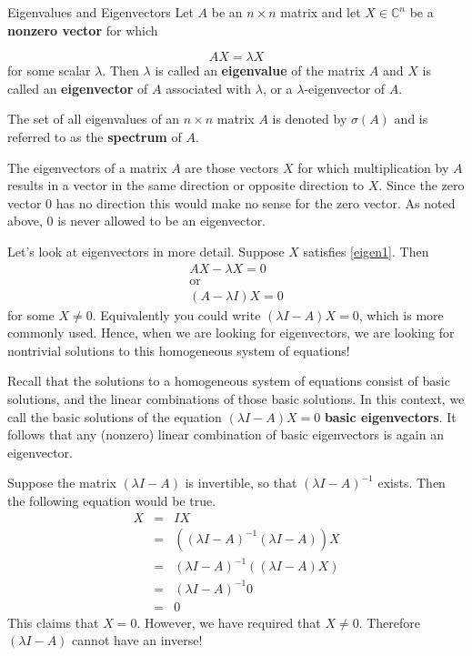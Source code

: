 \begin{definition}{Eigenvalues and Eigenvectors}\label{def:eigenvaluesandeigenvectors}
Let $A$ be an $n\times n$ matrix and let $X \in \mathbb{C}^{n}$ be a
\textbf{nonzero vector} for which

\begin{equation}
AX=\lambda X  \label{eigen1}
\end{equation}
for some scalar $\lambda .$ Then $\lambda $ is called an
\textbf{eigenvalue} of the matrix $A$ and $X$ is called an \textbf{eigenvector} of $A$ associated with $\lambda$, or a $\lambda$-eigenvector of $A$. 
 
The set of all eigenvalues of an $n\times n$ matrix $A$ is denoted by 
$\sigma \left( A\right) $ and is referred to as the \textbf{spectrum}
 of $A.$
\end{definition}

The eigenvectors of a matrix $A$ are those vectors $X$ for which
multiplication by $A$ results in a vector in the same direction or opposite
direction to $X$. Since the zero vector $0$ has no
direction this would make no sense for the zero vector. As noted above, 
$0$ is never allowed to be an eigenvector. 

Let's look at eigenvectors in more detail. Suppose $X$ satisfies \ref{eigen1}. Then
\begin{equation*}
\begin{array}{c}
AX - \lambda X = 0 \\
\mbox{or} \\
\left( A-\lambda I\right) X = 0
\end{array}
\end{equation*}
for some $X \neq 0.$ Equivalently you could write $\left( \lambda
I-A\right)X = 0$, which is more commonly used.  Hence, when we are looking for eigenvectors, we are
looking for nontrivial solutions to this homogeneous system of equations!

Recall that the solutions to a homogeneous system of equations consist
of basic solutions, and the linear combinations of those basic
solutions. In this context, we call the basic solutions of the
equation $\left( \lambda I - A\right) X = 0$ \textbf{basic
eigenvectors}. It follows that any (nonzero) linear combination of basic
eigenvectors is again an eigenvector.

Suppose the matrix $\left(\lambda I - A\right)$ is invertible, so that
$\left(\lambda I - A\right)^{-1}$ exists.
Then the following equation would be true.
\begin{eqnarray*}
X &=& IX \\
&=& \left( \left( \lambda I - A\right) ^{-1}\left(\lambda I - A \right)
\right) X \\
&=&\left( \lambda I - A\right) ^{-1}\left( \left( \lambda
I - A\right) X\right) \\
&=& \left( \lambda I - A\right) ^{-1}0 \\
&=& 0
\end{eqnarray*}
This claims that $X=0$. However, we have required that $ X \neq 0$. Therefore  $\left(\lambda I - A\right)$
cannot have an inverse! 

